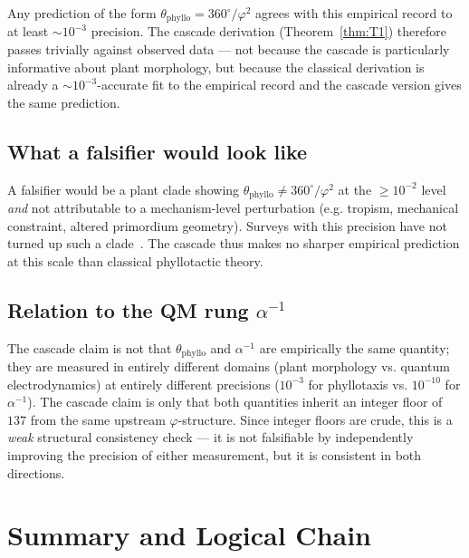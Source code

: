 \documentclass[12pt]{article}
\newcommand{\phig}{\varphi}
\begin{document}
Any prediction of the form $\theta_{\mathrm{phyllo}} =
360^{\circ}/\phig^2$ agrees with this empirical record to at least
$\sim 10^{-3}$ precision. The cascade derivation (Theorem~\ref{thm:T1})
therefore passes trivially against observed data --- not because the
cascade is particularly informative about plant morphology, but
because the classical derivation is already a $\sim 10^{-3}$-accurate
fit to the empirical record and the cascade version gives the same
prediction.

\subsection{What a falsifier would look like}

A falsifier would be a plant clade showing $\theta_{\mathrm{phyllo}}
\neq 360^{\circ}/\phig^2$ at the $\ge 10^{-2}$ level \emph{and} not
attributable to a mechanism-level perturbation (e.g. tropism,
mechanical constraint, altered primordium geometry). Surveys with
this precision have not turned up such a clade~\cite{Jean1994}.
The cascade thus makes no sharper empirical prediction at this scale
than classical phyllotactic theory.

\subsection{Relation to the QM rung $\alpha^{-1}$}

The cascade claim is not that $\theta_{\mathrm{phyllo}}$ and
$\alpha^{-1}$ are empirically the same quantity; they are measured
in entirely different domains (plant morphology vs. quantum
electrodynamics) at entirely different precisions ($10^{-3}$ for
phyllotaxis vs. $10^{-10}$ for $\alpha^{-1}$). The cascade claim is
only that both quantities inherit an integer floor of $137$ from
the same upstream $\phig$-structure. Since integer floors are
crude, this is a \emph{weak} structural consistency check --- it is
not falsifiable by independently improving the precision of either
measurement, but it is consistent in both directions.

\section{Summary and Logical Chain}\label{sec:chain}
\end{document}
